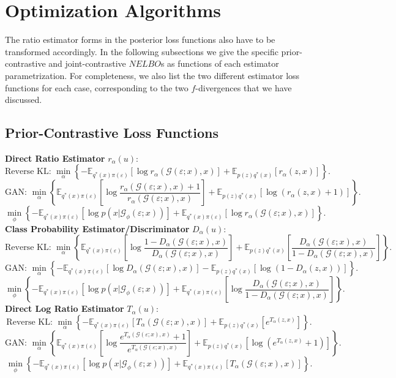 \documentclass[honours,12pt, twoside]{unswthesis}
\newcommand{\E}{\mathbb{E}}
\numberwithin{equation}{section}
\theoremstyle{definition}
\begin{document}
\section{Optimization Algorithms}
The ratio estimator forms in the posterior loss functions also have to be transformed accordingly. In the following subsections we give the specific prior-contrastive and joint-contrastive $NELBO$s as functions of each estimator parametrization. For completeness, we also list the two different estimator loss functions for each case, corresponding to the two $f$-divergences that we have discussed.
\subsection{Prior-Contrastive Loss Functions}
\textbf{Direct Ratio Estimator} $r_\alpha(u)$:
\[\text{Reverse KL: }\min_\alpha \left\lbrace-\E_{q^*(x)\pi(\varepsilon)}[\log r_\alpha(\mathcal{G}(\varepsilon;x),x)]+\E_{p(z)q^*(x)}[r_\alpha(z,x)]\right\rbrace.\]
\[\text{GAN: }\min_\alpha \left\lbrace\E_{q^*(x)\pi(\varepsilon)}\left[\log \frac{r_\alpha(\mathcal{G}(\varepsilon;x),x)+1}{r_\alpha(\mathcal{G}(\varepsilon;x),x)}\right]+\E_{p(z)q^*(x)}[\log(r_\alpha(z,x)+1)]\right\rbrace.\]
\[\min_\phi\left\lbrace-\E_{q^*(x)\pi(\varepsilon)}[\log p(x|\mathcal{G}_\phi(\varepsilon;x))]+\E_{q^*(x)\pi(\varepsilon)}[\log r_\alpha(\mathcal{G}(\varepsilon;x),x)]\right\rbrace.\]
\textbf{Class Probability Estimator/Discriminator} $D_\alpha(u)$:
\[\text{Reverse KL: }\min_\alpha \left\lbrace\E_{q^*(x)\pi(\varepsilon)}\left[\log \frac{1-D_\alpha(\mathcal{G}(\varepsilon;x),x)}{D_\alpha(\mathcal{G}(\varepsilon;x),x)}\right]+\E_{p(z)q^*(x)}\left[\frac{D_\alpha(\mathcal{G}(\varepsilon;x),x)}{1-D_\alpha(\mathcal{G}(\varepsilon;x),x)}\right]\right\rbrace.\]
\[\text{GAN: }\min_\alpha \left\lbrace-\E_{q^*(x)\pi(\varepsilon)}[\log D_\alpha(\mathcal{G}(\varepsilon;x),x)]-\E_{p(z)q^*(x)}[\log(1-D_\alpha(z,x))]\right\rbrace.\]
\[\min_\phi\left\lbrace-\E_{q^*(x)\pi(\varepsilon)}[\log p(x|\mathcal{G}_\phi(\varepsilon;x))]+\E_{q^*(x)\pi(\varepsilon)}\left[\log \frac{D_\alpha(\mathcal{G}(\varepsilon;x),x)}{1-D_\alpha(\mathcal{G}(\varepsilon;x),x)}\right]\right\rbrace.\]
\textbf{Direct Log Ratio Estimator} $T_\alpha(u)$:
\[\text{Reverse KL: }\min_\alpha \left\lbrace-\E_{q^*(x)\pi(\varepsilon)}[T_\alpha(\mathcal{G}(\varepsilon;x),x)]+\E_{p(z)q^*(x)}\left[e^{T_\alpha(z,x)}\right]\right\rbrace.\]
\[\text{GAN: }\min_\alpha \left\lbrace\E_{q^*(x)\pi(\varepsilon)}\left[\log \frac{e^{T_\alpha(\mathcal{G}(\varepsilon;x),x)}+1}{e^{T_\alpha(\mathcal{G}(\varepsilon;x),x)}}\right]+\E_{p(z)q^*(x)}[\log(e^{T_\alpha(z,x)}+1)]\right\rbrace.\]
\[\min_\phi\left\lbrace-\E_{q^*(x)\pi(\varepsilon)}[\log p(x|\mathcal{G}_\phi(\varepsilon;x))]+\E_{q^*(x)\pi(\varepsilon)}[T_\alpha(\mathcal{G}(\varepsilon;x),x)]\right\rbrace.\]
\end{document}
